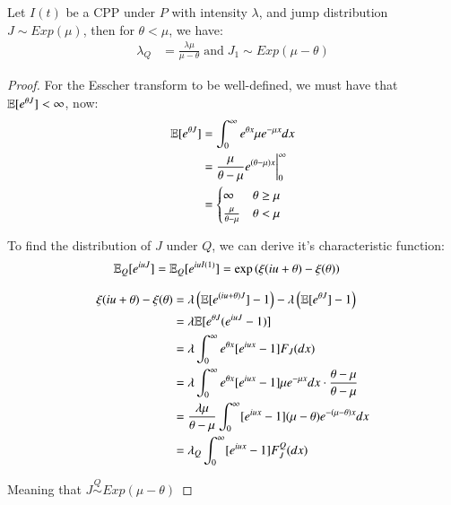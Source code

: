 \begin{lemma}
\label{lemma: CPP_exp_mu}
Let $I(t)$ be a CPP under $P$ with intensity $\lambda$, and jump distribution $J\sim Exp(\mu)$, then for $\theta < \mu$, we have: 
\begin{align*}
\lambda_{Q} &= \frac{\lambda \mu}{\mu - \theta}
\;\text{and}\; J_{1} \sim Exp(\mu - \theta)
\end{align*}
\end{lemma}

\begin{proof}
For the Esscher transform to be well-defined, we must have that $\mathbb{E}[e^{\theta J}] < \infty$, now:
\begin{align*}
\mathbb{E}[e^{\theta J}] &= \int_{0}^{\infty}e^{\theta x}\mu e^{-\mu x}dx \\ 
&= \frac{\mu}{\theta - \mu}e^{(\theta - \mu)x}\bigg{|}_{0}^{\infty} \\ 
 &=
    \begin{cases}
      \infty & \theta \geq \mu\\
      \frac{\mu}{\theta - \mu} & \theta < \mu
    \end{cases} 
\end{align*}

To find the distribution of $J$ under $Q$, we can derive it's characteristic function: 
\begin{align*}
\mathbb{E}_{Q}[e^{iuJ}] &= \mathbb{E}_{Q}[e^{iuI(1)}] =  \exp\left(
\xi(iu+\theta) - \xi(\theta)
\right)   
\end{align*}

\begin{align*}
\xi(iu+\theta) - \xi(\theta) &= 
\lambda\left(\mathbb{E}[e^{(iu+\theta)J}]-1\right)
- 
\lambda\left(\mathbb{E}[e^{\theta J}]-1\right) \\ 
&= 
\lambda\mathbb{E}[e^{\theta J}(e^{iuJ}-1)] \\ 
&= 
\lambda \int_{0}^{\infty}e^{\theta x}[e^{iux}-1]F_{J}(dx)
\\ 
&= \lambda \int_{0}^{\infty}e^{\theta x}[e^{iux}-1]\mu e^{-\mu x}dx \cdot \frac{\theta - \mu}{\theta - \mu} \\ 
&= 
\frac{\lambda \mu}{\theta - \mu}\int_{0}^{\infty}[e^{iux}-1](\mu-\theta)e^{-(\mu - \theta)x}dx \\ 
&= 
\lambda_{Q}\int_{0}^{\infty}[e^{iux}-1]F_{J}^{Q}(dx)
\end{align*}

Meaning that $J \stackrel{Q}{\sim} Exp(\mu - \theta)$
\end{proof}












